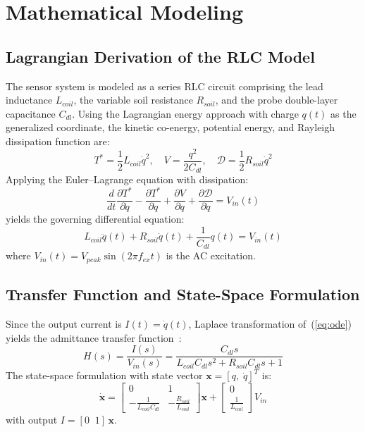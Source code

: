 \documentclass[conference]{IEEEtran}
\begin{document}
\section{Mathematical Modeling}
\subsection{Lagrangian Derivation of the RLC Model}
The sensor system is modeled as a series RLC circuit comprising the lead inductance $L_{coil}$, the variable soil resistance $R_{soil}$, and the probe double-layer capacitance $C_{dl}$. Using the Lagrangian energy approach with charge $q(t)$ as the generalized coordinate, the kinetic co-energy, potential energy, and Rayleigh dissipation function are:
\begin{equation}
T^* = \frac{1}{2}L_{coil}\dot{q}^2, \quad V = \frac{q^2}{2C_{dl}}, \quad \mathcal{D} = \frac{1}{2}R_{soil}\dot{q}^2
\end{equation}
Applying the Euler--Lagrange equation with dissipation:
\begin{equation}
\frac{d}{dt}\frac{\partial T^*}{\partial \dot{q}} - \frac{\partial T^*}{\partial q} + \frac{\partial V}{\partial q} + \frac{\partial \mathcal{D}}{\partial \dot{q}} = V_{in}(t)
\end{equation}
yields the governing differential equation:
\begin{equation}
L_{coil}\ddot{q}(t) + R_{soil}\dot{q}(t) + \frac{1}{C_{dl}}q(t) = V_{in}(t)
\label{eq:ode}
\end{equation}
where $V_{in}(t) = V_{peak}\sin(2\pi f_{ex}t)$ is the AC excitation.

\subsection{Transfer Function and State-Space Formulation}
Since the output current is $I(t) = \dot{q}(t)$, Laplace transformation of~(\ref{eq:ode}) yields the admittance transfer function~\cite{ogata2010}:
\begin{equation}
H(s) = \frac{I(s)}{V_{in}(s)} = \frac{C_{dl}s}{L_{coil}C_{dl}s^2 + R_{soil}C_{dl}s + 1}
\label{eq:tf}
\end{equation}
The state-space formulation with state vector $\mathbf{x} = [q,\; \dot{q}]^T$ is:
\begin{equation}
\dot{\mathbf{x}} = \begin{bmatrix} 0 & 1 \\ -\frac{1}{L_{coil}C_{dl}} & -\frac{R_{soil}}{L_{coil}} \end{bmatrix}\mathbf{x} + \begin{bmatrix} 0 \\ \frac{1}{L_{coil}} \end{bmatrix}V_{in}
\end{equation}
with output $I = [0\;\; 1]\,\mathbf{x}$.
\end{document}
